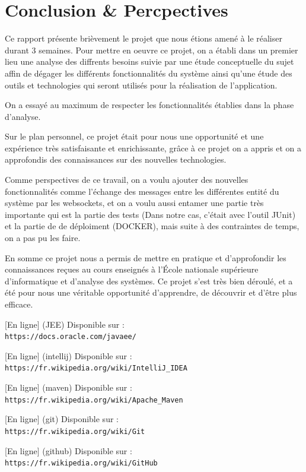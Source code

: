 \documentclass[12pt,a4paper,twoside]{report}
\begin{document}
	\chapter*{Conclusion \& Percpectives}
	\label{chap:conclusion}{
		Ce rapport présente brièvement le projet que nous étions amené à le réaliser durant 3 semaines. Pour mettre en oeuvre ce projet, on a établi dans un premier lieu
une analyse des diffrents besoins suivie par une étude conceptuelle du sujet affin de dégager les différents fonctionnalités du système ainsi qu'une étude des outils et technologies qui seront utilisés pour la réalisation de l'application.

On a essayé au maximum de respecter les fonctionnalités établies dans la phase d'analyse.

Sur le plan personnel, ce projet était pour nous une opportunité et une expérience très satisfaisante et enrichissante, grâce à ce projet on a appris et on a approfondis des connaissances sur des nouvelles technologies.

Comme perspectives de ce travail, on a voulu ajouter des nouvelles fonctionnalités comme l’échange des messages entre les différentes entité du système par les websockets, et on a voulu aussi entamer une partie très importante qui est la partie des tests (Dans notre cas, c'était avec l'outil JUnit) et la partie de de déploiment (DOCKER), mais suite à des contraintes de temps, on a pas pu les faire.

En somme ce projet nous a permis de mettre en pratique et d'approfondir les connaissances reçues au cours enseignés à l'École nationale supérieure d'informatique et d'analyse des systèmes. Ce projet s'est très bien déroulé, et a été pour nous une véritable opportunité d'apprendre, de découvrir et d'être plus efficace.
	}

\renewcommand{\bibname}{Bibliographie et Webographie}
\begin{thebibliography}{3}
	

	[En ligne] (JEE) Disponible sur :
	\\\texttt{https://docs.oracle.com/javaee/}

	[En ligne] (intellij) Disponible sur :
	\\\texttt{https://fr.wikipedia.org/wiki/IntelliJ\_IDEA}

	[En ligne] (maven) Disponible sur :
	\\\texttt{https://fr.wikipedia.org/wiki/Apache\_Maven}

	[En ligne] (git) Disponible sur :
	\\\texttt{https://fr.wikipedia.org/wiki/Git}

	[En ligne] (github) Disponible sur :
	\\\texttt{https://fr.wikipedia.org/wiki/GitHub}
\end{thebibliography}
\end{document}
